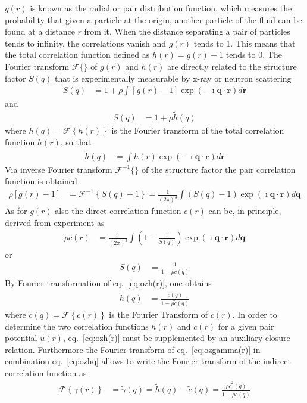  $g(r)$ is known as the radial or pair distribution  function, which measures the
probability that given a particle at the origin, another particle of
the fluid can be found at a distance $r$ from it. When the distance
separating a pair of particles tends to infinity, the correlations
vanish and $g(r)$ tends to 1. This means that the total correlation
function defined as $h(r)=g(r)-1$ tends to 0. The Fourier transform
$\mathscr{F} \{\}$ of $g(r)$ and $h(r)$ are directly related to the
structure factor $S(q)$ that is experimentally measurable by x-ray
or neutron scattering
\begin{align}
S(q)&=1+\rho \int
\left[g(r)-1\right]\exp\left(-\imath\mathbf{q}\cdot
\mathbf{r}\right) d\mathbf{r}
\end{align}
and
\begin{align}
S(q) &= 1+ \rho  \tilde{h}(q)
\end{align}
where $\tilde{h}(q)=\mathscr{F} \left\{h(r)\right\}$  is the Fourier
transform of the total correlation function $h(r)$, so that
\begin{align}
\tilde{h}(q) &= \int h(r) \exp\left(-\imath\mathbf{q}\cdot
\mathbf{r}\right) d\mathbf{r}
\end{align}
Via inverse Fourier transform $\mathscr{F}^{-1} \{\}$ of the
structure factor the pair correlation function is obtained
\begin{align}
\rho \left[ g(r)-1\right] &=\mathscr{F}^{-1} \left\{S(q)-1\right\} =
\frac{1}{(2\pi)^3} \int \left( S(q)-1
\right)\exp\left(\imath\mathbf{q}\cdot \mathbf{r}\right) d\mathbf{q}
\end{align}
As for $g(r)$ also the direct correlation function $c(r)$ can be, in
principle, derived from experiment as
\begin{align}
\rho c(r) &= \frac{1}{(2\pi)^3} \int \left(1-\frac{1}{S(q)}\right)
\exp\left(\imath\mathbf{q}\cdot \mathbf{r}\right) d\mathbf{q}
\end{align}
or
\begin{align}
S(q) &= \frac{1}{1-\rho \tilde{c}(q)} \label{eq:ozSq}
\end{align}
By Fourier transformation of eq.\ \ref{eq:ozh(r)}, one obtains
\begin{align}
\tilde{h}(q) &= \frac{\tilde{c}(q)}{1-\rho\tilde{c}(q)}
\label{eq:ozhq}
\end{align}
where $\tilde{c}(q)=\mathscr{F}\left\{c(r)\right\}$ is the Fourier
Transform of $c(r)$. In order to determine the two correlation
functions $h(r)$ and $c(r)$ for a given pair potential $u(r)$, eq.\
\ref{eq:ozh(r)} must be supplemented by an auxiliary closure
relation. Furthermore the Fourier transform of eq.\
\ref{eq:ozgamma(r)} in combination eq.\ \ref{eq:ozhq} allows to
write the Fourier transform of the indirect correlation function as
\begin{align}
\mathscr{F} \left\{\gamma(r)\right\} &= \tilde{\gamma}(q)  =
\tilde{h}(q) - \tilde{c}(q) =
\frac{\rho\tilde{c}^2(q)}{1-\rho\tilde{c}(q)} \label{eq:ozg(q)}
\end{align}



